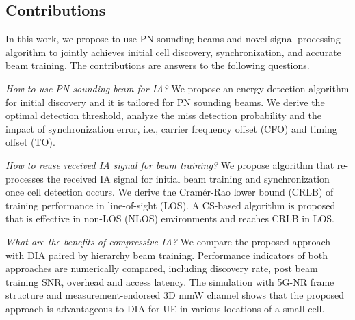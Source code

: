 \documentclass[journal]{IEEEtran}
\begin{document}

\subsection{Contributions}
In this work, we propose to use PN sounding beams and novel signal processing algorithm to jointly achieves initial cell discovery, synchronization, and accurate beam training. The contributions are answers to the following questions.

\textit{How to use PN sounding beam for IA?} We propose an energy detection algorithm for initial discovery and it is tailored for PN sounding beams. We derive the optimal detection threshold, analyze the miss detection probability and the impact of synchronization error, i.e., carrier frequency offset (CFO) and timing offset (TO).

\textit{How to reuse received IA signal for beam training?} We propose algorithm that re-processes the received IA signal for initial beam training and synchronization once cell detection occurs. We derive the Cram\'er-Rao lower bound (CRLB) of training performance in line-of-sight (LOS). A CS-based algorithm is proposed that is effective in non-LOS (NLOS) environments and reaches CRLB in LOS.

\textit{What are the benefits of compressive IA?} We compare the proposed approach with DIA paired by hierarchy beam training. Performance indicators of both approaches are numerically compared, including discovery rate, post beam training SNR, overhead and access latency. The simulation with 5G-NR frame structure and measurement-endorsed 3D mmW channel shows that the proposed approach is advantageous to DIA for UE in various locations of a small cell.
\end{document}
